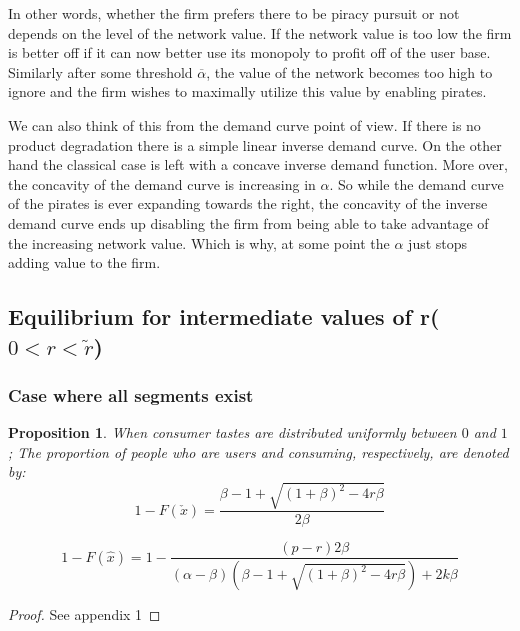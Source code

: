 \documentclass{article}
\newtheorem{proposition}{Proposition}
\begin{document}
In other words, whether the firm prefers there to be piracy pursuit or not depends on the level of the network value. If the network value is too low the firm is better off if it can now better use its monopoly to profit off of the user base. Similarly after some threshold $\overline{\alpha}$, the value of the network becomes too high to ignore and the firm wishes to maximally utilize this value by enabling pirates.  

We can also think of this from the demand curve point of view. If there is no product degradation there is a simple linear inverse demand curve. On the other hand the classical case is left with a concave inverse demand function. More over, the concavity of the demand curve is increasing in $\alpha$. So while the demand curve of the pirates is ever expanding towards the right, the concavity of the inverse demand curve ends up disabling the firm from being able to take advantage of the increasing network value. Which is why, at some point the $\alpha$ just stops adding value to the firm. 


\subsection{Equilibrium for intermediate values of r( $0<r<\tilde{r}$)}

\subsubsection{Case where all segments exist}

\begin{proposition}
When consumer tastes are distributed uniformly between $0$ and $1$;  The proportion of people who are users and consuming, respectively, are denoted by: 
\begin{equation}\label{eq:1}
1 - F(\check{x}) =\frac{ \beta  - 1 + \sqrt{ (1+\beta)^{2}- 4 r \beta  }}{2 \beta }
\end{equation}

\begin{equation}\label{eq:2}
1 - F(\hat{x})=1-\frac{(p-r)2 \beta}{(\alpha - \beta) \left( \beta  - 1 + \sqrt{ (1+\beta)^{2}- 4 r \beta }\right) +2k \beta}
\end{equation}


\end{proposition}

\begin{proof}
See appendix 1
\end{proof}
\end{document}
